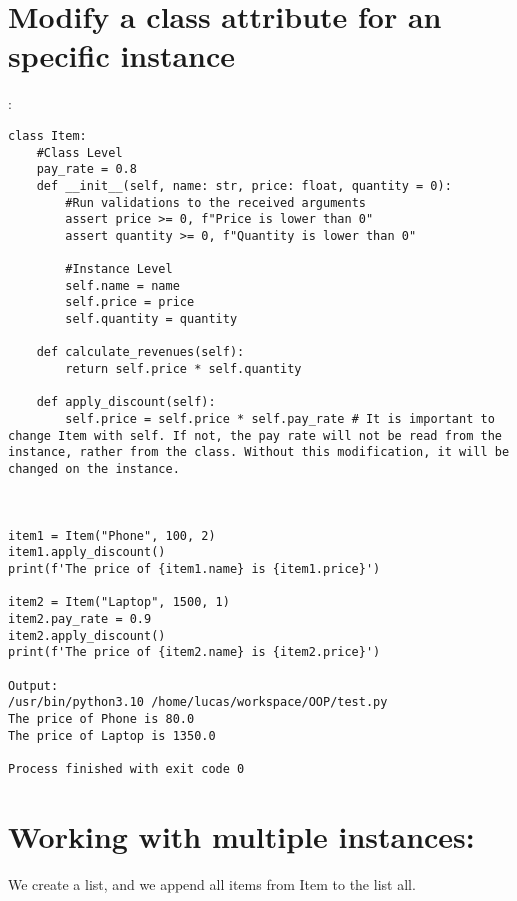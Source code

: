 \documentclass{article}
\begin{document}
\section{Modify a class attribute for an specific instance}:

\begin{lstlisting}
class Item:
	#Class Level
	pay_rate = 0.8
	def __init__(self, name: str, price: float, quantity = 0):
		#Run validations to the received arguments
		assert price >= 0, f"Price is lower than 0"
		assert quantity >= 0, f"Quantity is lower than 0"
		
		#Instance Level
		self.name = name
		self.price = price
		self.quantity = quantity
		
	def calculate_revenues(self):
		return self.price * self.quantity
		
	def apply_discount(self):
		self.price = self.price * self.pay_rate # It is important to change Item with self. If not, the pay rate will not be read from the instance, rather from the class. Without this modification, it will be changed on the instance.
		
	
	
item1 = Item("Phone", 100, 2)
item1.apply_discount()
print(f'The price of {item1.name} is {item1.price}')
	
item2 = Item("Laptop", 1500, 1)
item2.pay_rate = 0.9
item2.apply_discount()
print(f'The price of {item2.name} is {item2.price}')

Output:
/usr/bin/python3.10 /home/lucas/workspace/OOP/test.py 
The price of Phone is 80.0
The price of Laptop is 1350.0

Process finished with exit code 0

\end{lstlisting}

\section{Working with multiple instances:}
We create a list, and we append all items from Item to the list all.
\end{document}
